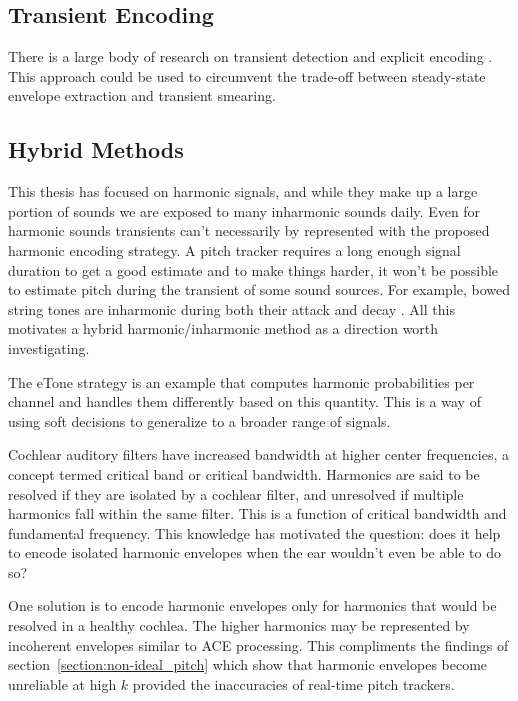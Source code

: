 \documentclass [11pt, proquest,oneside] {ganter_thesis}[2015/03/03]
\begin{document}
\subsection{Transient Encoding}

There is a large body of research on transient detection and explicit encoding \cite{bonada2000automatic}\cite{levine1998sines}\cite{masri1996computer}\cite{masri1996improved} .  This approach could be used to circumvent the trade-off between steady-state envelope extraction and transient smearing.

\subsection{Hybrid Methods}


This thesis has focused on harmonic signals, and while they make up a large portion of sounds we are exposed to many inharmonic sounds daily.  Even for harmonic sounds transients can't necessarily by represented with the proposed harmonic encoding strategy.  A pitch tracker requires a long enough signal duration to get a good estimate and to make things harder, it won't be possible to estimate pitch during the transient of some sound sources. For example, bowed string tones are inharmonic during both their attack and decay \cite{beauchamp1974time}.  All this motivates a hybrid harmonic/inharmonic method as a direction worth investigating.

The eTone strategy \cite{vandali2011development} is an example that computes harmonic probabilities per channel and handles them differently based on this quantity.  This is a way of using soft decisions to generalize to a broader range of signals.

Cochlear auditory filters have increased bandwidth at higher center frequencies, a concept termed critical band or critical bandwidth.  Harmonics are said to be resolved if they are isolated by a cochlear filter, and unresolved if multiple harmonics fall within the same filter.  This is a function of critical bandwidth and fundamental frequency.  This knowledge has motivated the question: does it help to encode isolated harmonic envelopes when the ear wouldn't even be able to do so?

One solution is to encode harmonic envelopes only for harmonics that would be resolved in a healthy cochlea.  The higher harmonics may be represented by incoherent envelopes similar to ACE processing.  This compliments the findings of section~\ref{section:non-ideal_pitch} which show that harmonic envelopes become unreliable at high $k$ provided the inaccuracies of real-time pitch trackers.
\end{document}
